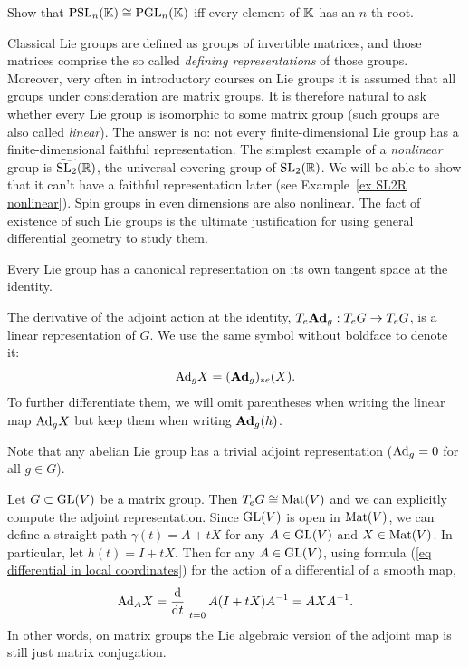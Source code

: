 \begin{xca}\label{xca psl=pgl}
    Show that $\operatorname{PSL}_n(\mathbb{K})\cong \operatorname{PGL}_n(\mathbb{K})$ iff every element of $\mathbb{K}$ has an $n$-th root.
\end{xca}

\begin{rem}
    Classical Lie groups are defined as groups of invertible matrices, and those matrices comprise the so called \emph{defining representations} of those groups. Moreover, very often in introductory courses on Lie groups it is assumed that all groups under consideration are matrix groups. It is therefore natural to ask whether every Lie group is isomorphic to some matrix group (such groups are also called \emph{linear}). The answer is no: not every finite-dimensional Lie group has a finite-dimensional faithful representation. The simplest example of a \emph{nonlinear} group is $\widetilde{\operatorname{SL}_2}(\mathbb{R})$, the universal covering group of $\operatorname{SL}_2(\mathbb{R})$.  We will be able to show that it can't have a faithful representation later (see Example~\ref{ex SL2R nonlinear}). Spin groups in even dimensions are also nonlinear. The fact of existence of such Lie groups is the ultimate justification for using general differential geometry to study them.
\end{rem}

Every Lie group has a canonical representation on its own tangent space at the identity.

\begin{defn}
    The derivative of the adjoint action at the identity, $T_e\mathrm{\mathbf{Ad}}_g:T_e G\to T_e G$, is a linear representation of $G$. We use the same symbol without boldface to denote it:
    \[\mathrm{Ad}_g X=(\mathrm{\mathbf{Ad}}_g)_{\ast e}(X).\]
    To further differentiate them, we will omit parentheses when writing the linear map $\mathrm{Ad}_g X$ but keep them when writing $\mathrm{\mathbf{Ad}}_g(h)$.
\end{defn}

    Note that any abelian Lie group has a trivial adjoint representation ($\mathrm{Ad}_g=0$ for all $g\in G$).

\begin{example}
    Let $G\subset \operatorname{GL}(V)$ be a matrix group. Then $T_e G\cong \operatorname{Mat}(V)$ and we can explicitly compute the adjoint representation. Since $\operatorname{GL}(V)$ is open in $\operatorname{Mat}(V)$, we can define a straight path $\gamma(t)=A+tX$ for any $A\in \operatorname{GL}(V)$ and $X\in \operatorname{Mat}(V)$. In particular, let $h(t)=I+tX$. Then for any $A\in \operatorname{GL}(V)$, using formula (\ref{eq differential in local coordinates}) for the action of a differential of a smooth map,
    \[\Ad_A X=\restr{\frac{\dd}{\dd t}}{t=0}A(I+tX)A^{-1}=AXA^{-1}.\]
    In other words, on matrix groups the Lie algebraic version of the adjoint map is still just matrix conjugation.
\end{example}






